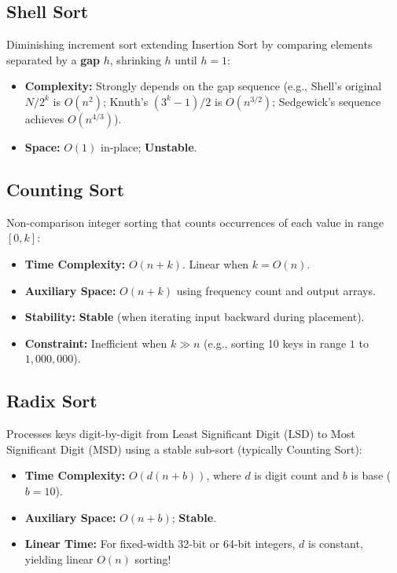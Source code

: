 \subsection{Shell Sort}
Diminishing increment sort extending Insertion Sort by comparing elements separated by a \textbf{gap} $h$, shrinking $h$ until $h = 1$:
\begin{itemize}
    \item \textbf{Complexity:} Strongly depends on the gap sequence (e.g., Shell's original $N/2^k$ is $O(n^2)$; Knuth's $(3^k - 1)/2$ is $O(n^{3/2})$; Sedgewick's sequence achieves $O(n^{4/3})$).
    \item \textbf{Space:} $O(1)$ in-place; \textbf{Unstable}.
\end{itemize}

\subsection{Counting Sort}
Non-comparison integer sorting that counts occurrences of each value in range $[0, k]$:
\begin{itemize}
    \item \textbf{Time Complexity:} $\boxed{O(n + k)}$. Linear when $k = O(n)$.
    \item \textbf{Auxiliary Space:} $\boxed{O(n + k)}$ using frequency count and output arrays.
    \item \textbf{Stability:} \textbf{Stable} (when iterating input backward during placement).
    \item \textbf{Constraint:} Inefficient when $k \gg n$ (e.g., sorting 10 keys in range $1$ to $1,000,000$).
\end{itemize}

\subsection{Radix Sort}
Processes keys digit-by-digit from Least Significant Digit (LSD) to Most Significant Digit (MSD) using a stable sub-sort (typically Counting Sort):
\begin{itemize}
    \item \textbf{Time Complexity:} $\boxed{O(d(n + b))}$, where $d$ is digit count and $b$ is base ($b = 10$).
    \item \textbf{Auxiliary Space:} $O(n + b)$; \textbf{Stable}.
    \item \textbf{Linear Time:} For fixed-width 32-bit or 64-bit integers, $d$ is constant, yielding linear $O(n)$ sorting!
\end{itemize}

